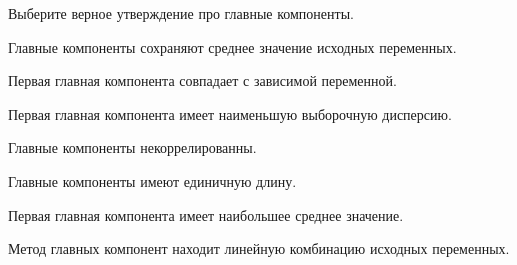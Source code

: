 
\begin{question}
Выберите верное утверждение про главные компоненты.
\begin{answerlist}
  \item Главные компоненты сохраняют среднее значение исходных переменных.
  \item Первая главная компонента совпадает с зависимой переменной.
  \item Первая главная компонента имеет наименьшую выборочную дисперсию.
  \item Главные компоненты некоррелированны.
  \item Главные компоненты имеют единичную длину.
  \item Первая главная компонента имеет наибольшее среднее значение.
\end{answerlist}
\end{question}

\begin{solution}
Метод главных компонент находит линейную комбинацию исходных переменных.
\end{solution}


